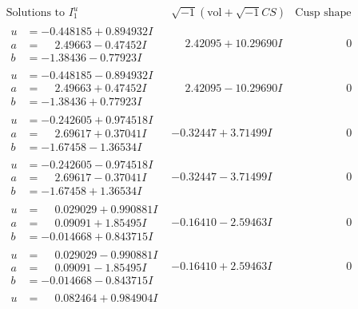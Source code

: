 \documentclass[1p]{elsarticle_modified}
\theoremstyle{definition}
\newcommand{\I}{\sqrt{-1}}
\begin{document}
$$\begin{array}{c|c|c}  
\text{Solutions to }I^u_{1}& \I (\text{vol} + \sqrt{-1}CS) & \text{Cusp shape}\\
 \hline 
\begin{aligned}
u &= -0.448185 + 0.894932 I \\
a &= \phantom{-}2.49663 - 0.47452 I \\
b &= -1.38436 - 0.77923 I\end{aligned}
 & \phantom{-}2.42095 + 10.29690 I & \phantom{-0.000000 } 0 \\ \hline\begin{aligned}
u &= -0.448185 - 0.894932 I \\
a &= \phantom{-}2.49663 + 0.47452 I \\
b &= -1.38436 + 0.77923 I\end{aligned}
 & \phantom{-}2.42095 - 10.29690 I & \phantom{-0.000000 } 0 \\ \hline\begin{aligned}
u &= -0.242605 + 0.974518 I \\
a &= \phantom{-}2.69617 + 0.37041 I \\
b &= -1.67458 - 1.36534 I\end{aligned}
 & -0.32447 + 3.71499 I & \phantom{-0.000000 } 0 \\ \hline\begin{aligned}
u &= -0.242605 - 0.974518 I \\
a &= \phantom{-}2.69617 - 0.37041 I \\
b &= -1.67458 + 1.36534 I\end{aligned}
 & -0.32447 - 3.71499 I & \phantom{-0.000000 } 0 \\ \hline\begin{aligned}
u &= \phantom{-}0.029029 + 0.990881 I \\
a &= \phantom{-}0.09091 + 1.85495 I \\
b &= -0.014668 + 0.843715 I\end{aligned}
 & -0.16410 - 2.59463 I & \phantom{-0.000000 } 0 \\ \hline\begin{aligned}
u &= \phantom{-}0.029029 - 0.990881 I \\
a &= \phantom{-}0.09091 - 1.85495 I \\
b &= -0.014668 - 0.843715 I\end{aligned}
 & -0.16410 + 2.59463 I & \phantom{-0.000000 } 0 \\ \hline\begin{aligned}
u &= \phantom{-}0.082464 + 0.984904 I \\

\end{aligned}
\end{array}$$
\end{document}
